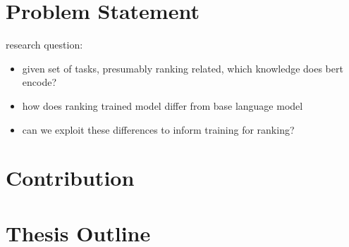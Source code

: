 \section{Problem Statement}
research question:
\begin{itemize}
    \item given set of tasks, presumably ranking related, which knowledge does bert encode?
    \item how does ranking trained model differ from base language model
    \item can we exploit these differences to inform training for ranking?
\end{itemize}
\section{Contribution}

\section{Thesis Outline}
